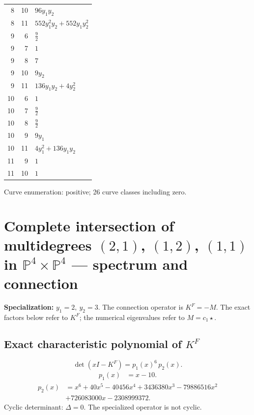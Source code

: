 \documentclass[10pt,a4paper]{article}
\begin{document}
{\begin{longtable}{rrp{125mm}}
8 & 10 & $96 y_{1} y_{2}$\\
8 & 11 & $552 y_{1}^{2} y_{2} + 552 y_{1} y_{2}^{2}$\\
9 & 6 & $\frac{9}{2}$\\
9 & 7 & $1$\\
9 & 8 & $7$\\
9 & 10 & $9 y_{2}$\\
9 & 11 & $136 y_{1} y_{2} + 4 y_{2}^{2}$\\
10 & 6 & $1$\\
10 & 7 & $\frac{9}{2}$\\
10 & 8 & $\frac{9}{2}$\\
10 & 9 & $9 y_{1}$\\
10 & 11 & $4 y_{1}^{2} + 136 y_{1} y_{2}$\\
11 & 9 & $1$\\
11 & 10 & $1$\\
\end{longtable}}
Curve enumeration: positive; 26 curve classes including zero.
\clearpage\section*{Complete intersection of multidegrees $(2,1)$, $(1,2)$, $(1,1)$ in $\mathbb P^{4}\times \mathbb P^{4}$ --- spectrum and connection}
\textbf{Specialization:} $y_1=2,\ y_2=3$. The connection operator is $K^F=-M$. The exact factors below refer to $K^F$; the numerical eigenvalues refer to $M=c_1\star$.
\subsection*{Exact characteristic polynomial of $K^F$}
\[\det(xI-K^F)=p_{1}(x)^{6}\,p_{2}(x).\]
\[\begin{aligned}p_{1}(x)&=x - 10.\end{aligned}\]
\[\begin{aligned}p_{2}(x)&=x^{6} + 40 x^{5} - 40456 x^{4} + 3436380 x^{3} - 79886516 x^{2}\\&+726083000 x - 2308999372.\end{aligned}\]
Cyclic determinant: $\Delta=0$. The specialized operator is not cyclic.
\end{document}
